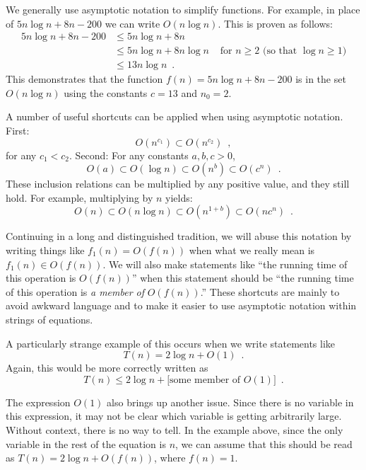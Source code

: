We generally use asymptotic notation to simplify functions.  For example,
in place of $5n\log n + 8n - 200$ we can write $O(n\log n)$.
This is proven as follows:
\begin{align*} 
       5n\log n + 8n - 200
        & \le 5n\log n + 8n \\
        & \le 5n\log n + 8n\log n & \mbox{ for $n\ge 2$ (so that $\log n \ge 1$)}
            \\
        & \le 13n\log n  \enspace .
\end{align*}
This demonstrates that the function $f(n)=5n\log n + 8n - 200$ is in
the set $O(n\log n)$ using the constants $c=13$ and $n_0 = 2$.

A number of useful shortcuts can be applied when using asymptotic
notation.  First:
\[ O(n^{c_1}) \subset O(n^{c_2}) \enspace ,\]
for any $c_1 < c_2$.  Second: For any constants $a,b,c > 0$,
\[ O(a) \subset O(\log n) \subset O(n^{b}) \subset O({c}^n) \enspace . \]
These inclusion relations can be multiplied by any positive value,
and they still hold. For example, multiplying by $n$ yields:
\[ O(n) \subset O(n\log n) \subset O(n^{1+b}) \subset O(n{c}^n) \enspace . \]

Continuing in a long and distinguished tradition, we will abuse this
notation by writing things like $f_1(n) = O(f(n))$ when what we really
mean is $f_1(n) \in O(f(n))$.  We will also make statements like ``the
running time of this operation is $O(f(n))$'' when this statement should
be ``the running time of this operation is \emph{a member of} $O(f(n))$.''
These shortcuts are mainly to avoid awkward language and to make it
easier to use asymptotic notation within strings of equations.

A particularly strange example of this occurs when we write statements like
\[
  T(n) = 2\log n + O(1)  \enspace .
\]
Again, this would be more correctly written as
\[
  T(n) \le 2\log n + [\mbox{some member of $O(1)$]}  \enspace .
\]

The expression $O(1)$ also brings up another issue. Since there is
no variable in this expression, it may not be clear which variable is
getting arbitrarily large.  Without context, there is no way to tell.
In the example above, since the only variable in the rest of the equation
is $n$, we can assume that this should be read as $T(n) = 2\log n +
O(f(n))$, where $f(n) = 1$.


